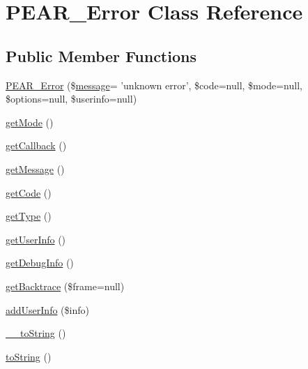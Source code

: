 \hypertarget{classPEAR__Error}{\section{P\-E\-A\-R\-\_\-\-Error Class Reference}
\label{classPEAR__Error}
}
\subsection*{Public Member Functions}
\begin{DoxyCompactItemize}
\item 
\hyperlink{classPEAR__Error_a4df056a45879501a8b563c896fe608a3}{P\-E\-A\-R\-\_\-\-Error} (\$\hyperlink{classmessage}{message}= 'unknown error', \$code=null, \$mode=null, \$options=null, \$userinfo=null)
\item 
\hyperlink{classPEAR__Error_adf8ebb12d192a152c0f3f80b5ca01e7c}{get\-Mode} ()
\item 
\hyperlink{classPEAR__Error_a8060f0ee49b7346e4ca6e04aa70ae25c}{get\-Callback} ()
\item 
\hyperlink{classPEAR__Error_a00beb48b680580de68477d0f77e27510}{get\-Message} ()
\item 
\hyperlink{classPEAR__Error_a54924b41ab0d14ed7007f3c1b3f0ca82}{get\-Code} ()
\item 
\hyperlink{classPEAR__Error_acebd26397af611328c6a7125cbc6284b}{get\-Type} ()
\item 
\hyperlink{classPEAR__Error_a3933a88dc76b37aace3c333ce91f8560}{get\-User\-Info} ()
\item 
\hyperlink{classPEAR__Error_a33eade09a689fdb4e5a79727fa407f13}{get\-Debug\-Info} ()
\item 
\hyperlink{classPEAR__Error_a7892a046070c977e5fcba9fcb749673d}{get\-Backtrace} (\$frame=null)
\item 
\hyperlink{classPEAR__Error_a229db64a10b64f41644ec19cf3c1e47b}{add\-User\-Info} (\$info)
\item 
\hyperlink{classPEAR__Error_a82c4bf3c440d5b8663b214d799d08d74}{\-\_\-\-\_\-to\-String} ()
\item 
\hyperlink{classPEAR__Error_ae1b052b3d6ae9b74dbc3d348f894b6d2}{to\-String} ()
\end{DoxyCompactItemize}

